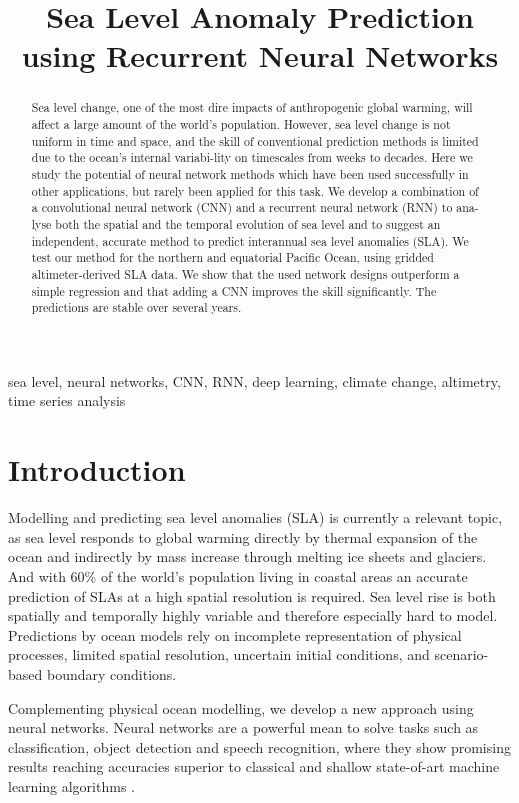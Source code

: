 \documentclass{article}
\title{Sea Level Anomaly Prediction using Recurrent Neural Networks}
\begin{document}
\maketitle
\begin{abstract}
Sea level change, one of the most dire impacts of anthropogenic global warming, will affect a large amount of the world's population. However, sea level change is not uniform in time and space, and the skill of conventional prediction methods is limited due to the ocean's internal variabi-lity on timescales from weeks to decades. Here we study the potential of neural network methods which have been used successfully in other applications, but rarely been applied for this task.
We develop a combination of a convolutional neural network (CNN) and a recurrent neural network (RNN) to ana-lyse both the spatial and the temporal evolution of sea level and to suggest an independent, accurate method to predict interannual sea level anomalies (SLA).
We test our method for the northern and equatorial Pacific Ocean, using gridded altimeter-derived SLA data.
We show that the used network designs outperform a simple regression and that adding a CNN improves the skill significantly. The predictions are stable over several years.
\end{abstract}
\begin{keywords}
sea level, neural networks, CNN, RNN, deep learning, climate change, altimetry, time series analysis
\end{keywords}

\section{Introduction}
\label{sec:intro}

Modelling and predicting sea level anomalies (SLA) is currently a relevant topic, as sea level responds to global warming directly by thermal expansion of the ocean and indirectly by mass increase through melting ice sheets and glaciers.
And with 60\% of the world's population living in coastal areas an accurate prediction of SLAs at a high spatial resolution is required. Sea level rise is both spatially and temporally highly variable and therefore especially hard to model.
Predictions by ocean models rely on incomplete representation of physical processes, limited spatial resolution, uncertain initial conditions, and scenario-based boundary conditions.

Complementing physical ocean modelling, we develop a new approach using neural networks. Neural networks are a powerful mean to solve tasks such as classification, object detection and speech recognition, where they show promising results reaching accuracies superior to classical and shallow state-of-art machine learning algorithms \cite{c22}.
\end{document}
